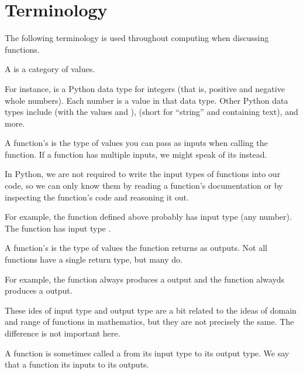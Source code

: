\documentclass[letterpaper,10pt,english]{sphinxmanual}
\begin{document}
\section{Terminology}
\label{\detokenize{chapter-2-mathematical-foundations:terminology}}
The following terminology is used throughout computing when discussing functions.

 A  is a category of values.

For instance,  is a Python data type for integers (that is, positive and negative whole numbers).  Each number is a value in that data type.  Other Python data types include  (with the values  and ),  (short for “string” and containing text), and more.

 A function’s  is the type of values you can pass as inputs when calling the function.  If a function has multiple inputs, we might speak of its  instead.

In Python, we are not required to write the input types of functions into our code, so we can only know them by reading a function’s documentation or by inspecting the function’s code and reasoning it out.

For example, the  function defined above probably has input type  (any number).  The  function has input type .

 A function’s  is the type of values the function returns as outputs.  Not all functions have a single return type, but many do.

For example, the  function always produces a  output and the  function alwayds produces a  output.

These ides of input type and output type are a bit related to the ideas of domain and range of functions in mathematics, but they are not precisely the same.  The difference is not important here.

 A function is sometimes called a  from its input type to its output type.  We say that a function  its inputs to its outputs.
\end{document}
